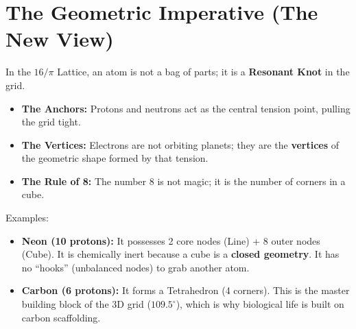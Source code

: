 \documentclass[11pt, letterpaper, openany]{book}
\begin{document}
\section{The Geometric Imperative (The New View)}

In the $16/\pi$ Lattice, an atom is not a bag of parts; it is a \textbf{Resonant Knot} in the grid.

\begin{itemize}
    \item \textbf{The Anchors:} Protons and neutrons act as the central tension point, pulling the grid
    tight.
    \item \textbf{The Vertices:} Electrons are not orbiting planets; they are the \textbf{vertices} of the
    geometric shape formed by that tension.
    \item \textbf{The Rule of 8:} The number 8 is not magic; it is the number of corners in a cube.
\end{itemize}

Examples:

\begin{itemize}
    \item \textbf{Neon (10 protons):} It possesses 2 core nodes (Line) + 8 outer nodes (Cube).
    It is chemically inert because a cube is a \textbf{closed geometry}. It has no “hooks”
    (unbalanced nodes) to grab another atom.
    \item \textbf{Carbon (6 protons):} It forms a Tetrahedron (4 corners). This is the master building
    block of the 3D grid ($109.5^\circ$), which is why biological life is built on carbon scaffolding.
\end{itemize}

\begin{table}[H]
\centering
\caption{Fundamental molecular geometries.}
\end{table}
\end{document}
